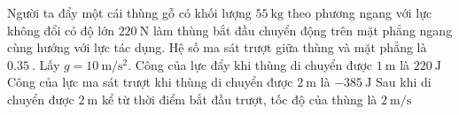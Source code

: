 \begin{ex}
	Người ta đẩy một cái thùng gỗ có khối lượng $\SI{55}{\kilogram}$ theo phương ngang với lực không đổi có độ lớn $\SI{220}{\newton}$ làm thùng bắt đầu chuyển động trên mặt phẳng ngang cùng hướng với lực tác dụng. Hệ số ma sát trượt giữa thùng và mặt phẳng là $\SI{0.35}{}$. Lấy $g =\SI{10}{\meter/\second^2}$.
	{\True Công của lực đẩy khi thùng di chuyển được $\SI{1}{\meter}$ là $\SI{220}{\joule}$}
	{\True Công của lực ma sát trượt khi thùng di chuyển được $\SI{2}{\meter}$ là $\SI{-385}{\joule}$
	}
	{Sau khi di chuyển được $\SI{2}{\meter}$ kể từ thời điểm bắt đầu trượt, tốc độ của thùng là $\SI{2}{\meter/\second}$}
\end{ex}

